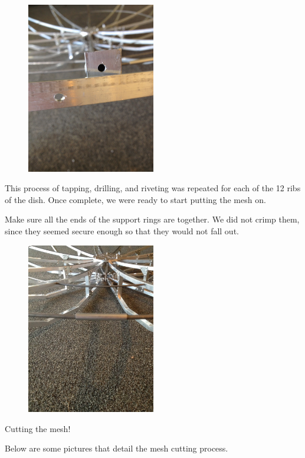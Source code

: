 \documentclass[11pt]{article} %
\begin{document}
\begin{figure}
  \centering
  \caption{   }
  \includegraphics[width=0.50\textwidth]{dish/06.jpeg}
\end{figure}


This process of tapping, drilling, and riveting was repeated for each of the 12 ribs of the dish. Once complete, we were ready to start putting the mesh on.

Make sure all the ends of the support rings are together. We did not crimp them, since they seemed secure enough so that they would not fall out.

\begin{figure}
  \centering
  \caption{   }
  \includegraphics[width=0.50\textwidth]{dish/07.jpeg}
\end{figure}

Cutting the mesh!

Below are some pictures that detail the mesh cutting process.
\end{document}
